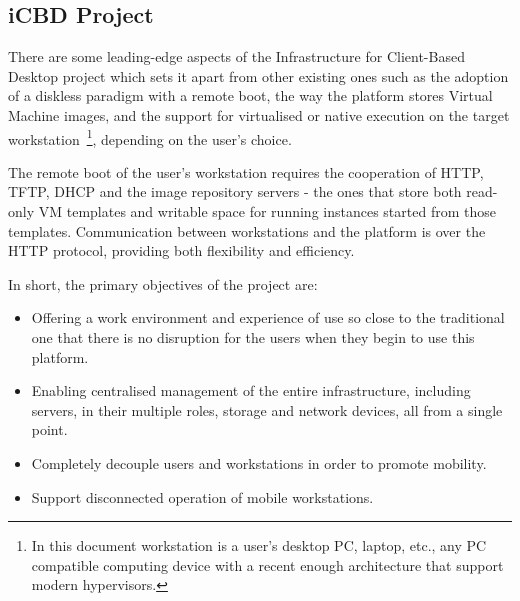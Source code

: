 


\subsection{iCBD Project} %
\label{sub:intro_icbd_project}

There are some leading-edge aspects of the Infrastructure for Client-Based Desktop project which sets it apart from other existing ones such as the adoption of a diskless paradigm with a remote boot, the way the platform stores Virtual Machine images, and the support for virtualised or native execution on the target workstation~\footnote{In this document workstation is a user's desktop PC, laptop, etc., any PC compatible computing device with a recent enough architecture that support modern hypervisors.}, depending on the user’s choice.~\cite{P2020}

The remote boot of the user’s workstation requires the cooperation of HTTP, TFTP, DHCP and the image repository servers - the ones that store both read-only VM templates and writable space for running
instances started from those templates. Communication between workstations and the platform is over the HTTP protocol, providing both flexibility and efficiency.~\cite{P2020,Nuno2016,Eduardo2016}



In short, the primary objectives of the project are:

\begin{itemize}
    \item Offering a work environment and experience of use so close to the traditional one that there is no disruption for the users when they begin to use this platform.
    \item Enabling centralised management of the entire infrastructure, including servers, in their multiple roles, storage and network devices, all from a single point.
    \item Completely decouple users and workstations in order to promote mobility.
    \item Support disconnected operation of mobile workstations.
\end{itemize}

